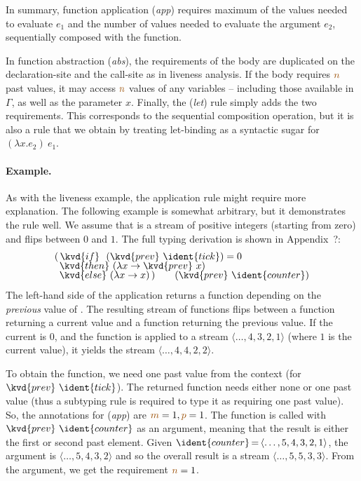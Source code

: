 In summary, function application (\emph{app}) requires maximum of the values needed to evaluate 
$e_1$ and the number of values needed to evaluate the argument $e_2$, sequentially composed with
the function. 

In function abstraction (\emph{abs}), the requirements of the body are duplicated on the declaration-site
and the call-site as in liveness analysis. If the body requires $\aclrd{n}$ past values, it may access
$\aclrd{n}$ values of any variables -- including those available in $\Gamma$, as well as the parameter
$x$. Finally, the (\emph{let}) rule simply adds the two requirements. This corresponds to the sequential
composition operation, but it is also a rule that we obtain by treating let-binding as a syntactic 
sugar for $(\lambda x.e_2)~e_1$.


\paragraph{Example.} 
As with the liveness example, the application rule might require more explanation. The following 
example is somewhat arbitrary, but it demonstrates the rule well. We assume that  
is a stream of positive integers (starting from zero) and  flips between $0$ and $1$.
The full typing derivation is shown in Appendix~?:
%
\begin{equation*}
\begin{array}{l}
(\,   \kvd{if}~~(\kvd{prev}~\ident{tick})=0\\[-0.25em]
\,\,\, \kvd{then}~(\lambda x \rightarrow \kvd{prev}~x)\\[-0.25em]
\,\,\, \kvd{else}~(\lambda x \rightarrow x) \,)\qquad(\kvd{prev}~\ident{counter})
\end{array}
\end{equation*}
%
The left-hand side of the application returns a function depending on the \emph{previous}
value of . The resulting stream of functions flips between a function returning
a current value and a function returning the previous value. If the current  is 0, and
the function is applied to a stream $\langle{\ldots,4,3,2,1}\rangle$ 
(where $1$ is the current value), it yields the stream $\langle{\ldots,4,4,2,2}\rangle$. 

To obtain the function, we need one past value from the context (for $\kvd{prev}~\ident{tick}$). The 
returned function needs either none or one past value (thus a subtyping rule is required to type 
it as requiring one past value). So, the annotations for (\emph{app}) are $\aclrd{m}=1, \aclrd{p}=1$.
The function is called with $\kvd{prev}~\ident{counter}$ as an argument, meaning that the result
is either the first or second past element. Given 
$\ident{counter}\hspace{-0.1em}=\hspace{-0.1em}\langle{\ldots,5,4,3,2,1}\rangle$, the argument 
is $\langle{\ldots,5,4,3,2}\rangle$ and so the overall result is a stream $\langle{\ldots,5,5,3,3}\rangle$.
From the argument, we get the requirement $\aclrd{n}=1$.

